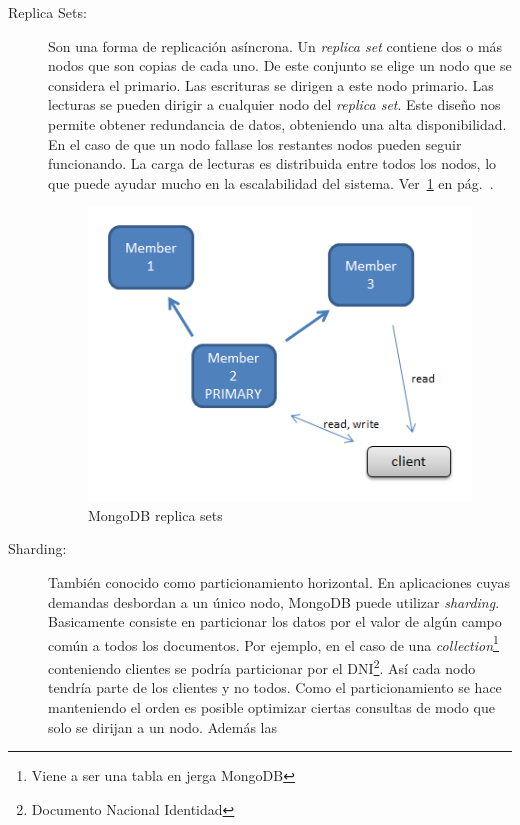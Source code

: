 \begin{description}
\item[Replica Sets:] Son una forma de replicación asíncrona. Un
  \emph{replica set} contiene dos o más nodos que son copias de cada
  uno. De este conjunto se elige un nodo que se considera el
  primario. Las escrituras se dirigen a este nodo primario. Las
  lecturas se pueden dirigir a cualquier nodo del \emph{replica
    set}. Este diseño nos permite obtener redundancia de datos,
  obteniendo una alta disponibilidad. En el caso de que un nodo
  fallase los restantes nodos pueden seguir funcionando. La carga de
  lecturas es distribuida entre todos los nodos, lo que puede ayudar
  mucho en la escalabilidad del sistema. Ver~\ref{replica-sets}
  en pág.~\pageref{replica-sets}.
  \begin{figure}[hbp]
    \begin{center}
      \includegraphics[]{chapters/technical-manual/replset.png}
    \end{center}
  \caption{MongoDB replica sets}\label{replica-sets}
  \end{figure}
\item[Sharding:] También conocido como particionamiento horizontal. En
  aplicaciones cuyas demandas desbordan a un único nodo, MongoDB puede
  utilizar \emph{sharding}. Basicamente consiste en particionar los
  datos por el valor de algún campo común a todos los documentos. Por
  ejemplo, en el caso de una \emph{collection}\footnote{Viene a ser
    una tabla en jerga MongoDB} conteniendo clientes se podría
  particionar por el DNI\footnote{Documento Nacional Identidad}. Así
  cada nodo tendría parte de los clientes y no todos. Como el
  particionamiento se hace manteniendo el orden es posible optimizar
  ciertas consultas de modo que solo se dirijan a un nodo. Además las

\end{description}
